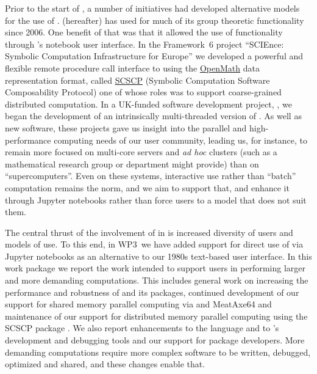 Prior to the start of \ODK, a number of initiatives had developed
alternative models for the use of \GAP. \SageMath (\Sage hereafter)
has used \GAP for much of its group theoretic functionality since
2006. One benefit of that was that it allowed the use of \GAP
functionality through \Sage's notebook user interface. In the Framework~6 project
``SCIEnce: Symbolic Computation Infrastructure for Europe'' we
developed a powerful and flexible remote procedure call interface to
\GAP using the \href{https://www.openmath.org/}{OpenMath} data representation format, called
\href{https://www.openmath.org/standard/scscp/}{SCSCP}
(Symbolic Computation Software Composability Protocol) one of
whose roles was to support coarse-grained distributed computation. In
a UK-funded software development project, \HPCGAP, we began the
development of an intrinsically multi-threaded version of \GAP. As
well as new software, these projects gave us insight into the parallel
and high-performance computing needs of our user community, leading
us, for instance, to remain more focused on multi-core servers and
\textit{ad hoc} clusters (such as a mathematical research group or
department might provide) than on ``supercomputers''. Even on these
systems, interactive use rather than ``batch'' computation remains the
norm, and we aim to support that, and enhance it through Jupyter
notebooks rather than force users to a model that does not suit them.

The central thrust of the involvement of \GAP in \ODK is increased
diversity of users and models of use. To this end, in WP3~we have
added support for direct use of \GAP via Jupyter notebooks as an
alternative to our 1980s text-based user interface. In this work package we report the
work intended to support \GAP users in performing larger and more
demanding computations. This includes general work on increasing the
performance and robustness of \GAP and its packages, continued
development of our support for shared memory parallel computing via
\HPCGAP and MeatAxe64 and maintenance of our support for distributed
memory parallel computing using the SCSCP package \cite{SCSCP}.
We also report enhancements to the \GAP language and to
\GAP's development and debugging tools and our support for package
developers. More demanding computations require more complex software
to be written, debugged, optimized and shared, and these changes
enable that.

